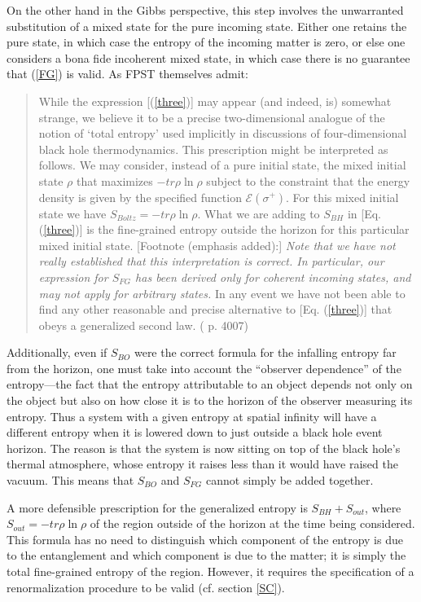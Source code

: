\documentclass[12pt]{article}
\begin{document}
On the other hand in the Gibbs perspective, this step involves the unwarranted substitution of a mixed state for the pure incoming state.  Either one retains the pure state, in which case the entropy of the incoming matter is zero, or else one considers a bona fide incoherent mixed state, in which case there is no guarantee that (\ref{FG}) is valid.  As FPST themselves admit:
\begin{quote}\small
While the expression [(\ref{three})] may appear (and indeed, is) somewhat strange, we believe it to be a precise two-dimensional analogue of the notion of `total entropy' used implicitly in discussions of four-dimensional black hole thermodynamics.  This prescription might be interpreted as follows.  We may consider, instead of a pure initial state, the mixed initial state $\rho$ that maximizes $-tr \rho\ln \rho$ subject to the constraint that the energy density is given by the specified function $\mathcal{E}(\sigma^{+})$.  For this mixed initial state we have $S_{Boltz} = -tr \rho\ln \rho$.  What we are adding to $S_{BH}$ in [Eq. (\ref{three})] is the fine-grained entropy outside the horizon for this particular mixed initial state.  [Footnote (emphasis added):] \emph{Note that we have not really established that this interpretation is correct.  In particular, our expression for $S_{FG}$ has been derived only for coherent incoming states, and may not apply for arbitrary states.}  In any event we have not been able to find any other reasonable and precise alternative to [Eq. (\ref{three})] that obeys a generalized second law.  (\cite{fiola94} p. 4007)
\end{quote}
Additionally, even if $S_{BO}$ were the correct formula for the infalling entropy far from the horizon, one must take into account the ``observer dependence'' \cite{MMR04} of the entropy---the fact that the entropy attributable to an object depends not only on the object but also on how close it is to the horizon of the observer measuring its entropy.  Thus a system with a given entropy at spatial infinity will have a different entropy when it is lowered down to just outside a black hole event horizon.  The reason is that the system is now sitting on top of the black hole's thermal atmosphere, whose entropy it raises less than it would have raised the vacuum.  This means that $S_{BO}$ and $S_{FG}$ cannot simply be added together.

A more defensible prescription for the generalized entropy is $S_{BH} + S_{out}$, where $S_{out} = -tr \rho\ln \rho$ of the region outside of the horizon at the time being considered.  This formula has no need to distinguish which component of the entropy is due to the entanglement and which component is due to the matter; it is simply the total fine-grained entropy of the region.  However, it requires the specification of a renormalization procedure to be valid (cf. section \ref{SC}).
\end{document}
